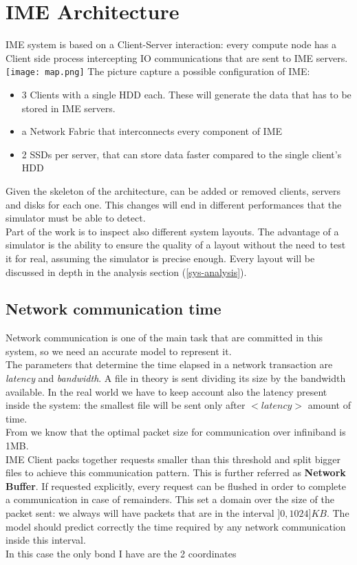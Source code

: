 
\section{IME Architecture}
IME system is based on a Client-Server interaction: every compute node has a
Client side process intercepting IO communications that are sent to IME servers.
\texttt{[image: map.png]}
The picture capture a possible configuration of IME:
\begin{itemize}
    \item 3 Clients with a single HDD each. These will generate the data that
        has to be stored in IME servers.
    \item a Network Fabric that interconnects every component of IME
    \item 2 SSDs per server, that can store data faster compared to the single
        client's HDD
\end{itemize}

Given the skeleton of the architecture, can be added or removed clients,
servers and disks for each one. This changes will end in different performances
that the simulator must be able to detect. \\
Part of the work is to inspect also different system layouts. The advantage of a
simulator is the ability to ensure the quality of a layout without the need to
test it for real, assuming the simulator is precise enough.
Every layout will be discussed in depth in the analysis section
(\ref{sys-analysis}).

\subsection{Network communication time}\label{netbuff}
Network communication is one of the main task that are committed in this system,
so we need an accurate model to represent it. \\
The parameters that determine the time elapsed in a network transaction are
\textit{latency} and \textit{bandwidth}. A file in theory is sent dividing
its size by the bandwidth available. In the real world we have to keep account also
the latency present inside the system: the smallest file will be sent
only after $<latency>$ amount of time. \\
From \cite{packet-size-ib} we know that the optimal packet size for
communication over infiniband is 1MB. \\
IME Client packs together requests smaller than this threshold and split bigger
files to achieve this communication pattern. This is further referred as
\textbf{Network Buffer}.  If requested explicitly, every request can be flushed
in order to complete a communication in case of remainders.  This set a domain
over the size of the packet sent: we always will have packets that are in the
interval $]0, 1024] KB$. The model should predict correctly the time required by
any network communication inside this interval. \\ In this case the only bond I
have are the 2 coordinates \\

